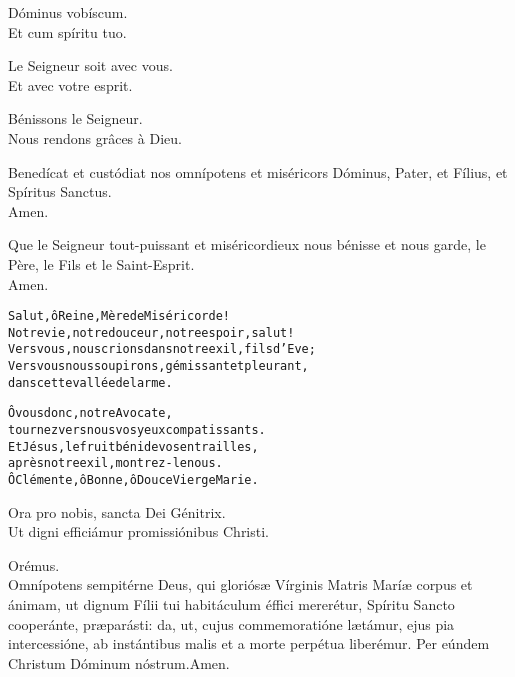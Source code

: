 \documentclass[twoside]{article}
\begin{document}
\begin{paracol}[1]{2}
\switchcolumn*

\vv Dóminus vobíscum. \\
\rr Et cum spíritu tuo.


\switchcolumn

\vv Le Seigneur soit avec vous. \\
\rr Et avec votre esprit.

\vv Bénissons le Seigneur. \\
\rr Nous rendons grâces à Dieu.

\switchcolumn*

\vv Benedícat et custódiat nos omnípotens et miséricors Dóminus, \cc Pater, et Fílius, et Spíritus Sanctus.\\
\rr Amen.

\switchcolumn

\vv Que le Seigneur tout-puissant et miséricordieux nous bénisse et nous garde, \cc le Père, le Fils et le Saint-Esprit. \\
\rr Amen.

\switchcolumn*


\switchcolumn \newpage
\begin{alltt}\normalfont





             Salut, ô Reine, Mère de Miséricorde !
             Notre vie, notre douceur, notre espoir, salut !
             Vers vous, nous crions dans notre exil, fils d’Eve ;
             Vers vous nous soupirons, gémissant et pleurant,
             dans cette vallée de larme.


             Ô vous donc, notre Avocate,
             tournez vers nous vos yeux compatissants.
             Et Jésus, le fruit béni de vos entrailles,
             après notre exil, montrez-le nous.
             Ô Clémente, ô Bonne, ô Douce Vierge Marie.
\end{alltt}
\switchcolumn*

\vv Ora pro nobis, sancta Dei Génitrix.\\
\rr Ut digni efficiámur promissiónibus Christi.

Orémus.\\
Omnípotens sempitérne Deus, qui gloriósæ Vírginis Matris Maríæ corpus et ánimam, ut dignum Fílii tui habitáculum éffici mererétur, Spíritu Sancto cooperánte, præparásti: da, ut, cujus commemoratióne lætámur, ejus pia intercessióne, ab instántibus malis et a morte perpétua liberémur. Per eúndem Christum Dóminum nóstrum.\capsaut \rr Amen.


\end{paracol}
\end{document}
